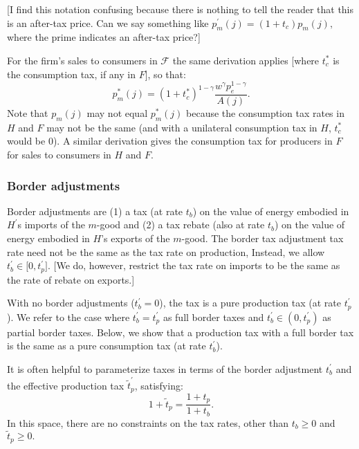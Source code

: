 \documentclass[notitlepage,12pt]{article}
\begin{document}
[I find this notation confusing because there is nothing to tell the reader
that this is an after-tax price. Can we say something like $p_{m}^{\prime
}\left( j\right) =\left( 1+t_{c}\right) p_{m}\left( j\right) ,$ where the
prime indicates an after-tax price?]

For the firm's sales to consumers in $\mathcal{F}$ the same derivation
applies [where $t_{c}^{\ast }$ is the consumption tax, if any in $F$], so
that:%
\begin{equation*}
p_{m}^{\ast }(j)=\left( 1+t_{c}^{\ast }\right) ^{1-\gamma }\frac{w^{\gamma
}p_{e}^{1-\gamma }}{A(j)}.
\end{equation*}%
Note that $p_{m}\left( j\right) $ may not equal $p_{m}^{\ast }\left(
j\right) $ because the consumption tax rates in $H$ and $F$ may not be the
same (and with a unilateral consumption tax in $H$, $t_{c}^{\ast }$ would be 
$0$). A similar derivation gives the consumption tax for producers in $F$
for sales to consumers in $H$ and $F$.

\subsubsection{Border adjustments}

Border adjustments are (1) a tax (at rate $t_{b}$) on the value of energy
embodied in $H^{\prime }$s imports of the $m$-good and (2) a tax rebate
(also at rate $t_{b}$) on the value of energy embodied in $H$'s exports of
the $m$-good. The border tax adjustment tax rate need not be the same as the
tax rate on production, Instead, we allow $t_{b}^{\prime }\in \lbrack
0,t_{p}^{\prime }]$. [We do, however, restrict the tax rate on imports to be
the same as the rate of rebate on exports.]

With no border adjustments ($t_{b}^{\prime }=0$), the tax is a pure
production tax (at rate $t_{p}^{\prime }$). We refer to the case where $%
t_{b}^{\prime }=t_{p}^{\prime }$ as full border taxes and $t_{b}^{\prime
}\in \left( 0,t_{p}^{\prime }\right) $ as partial border taxes. Below, we
show that a production tax with a full border tax is the same as a pure
consumption tax (at rate $t_{b}^{\prime }$).

It is often helpful to parameterize taxes in terms of the border adjustment $%
t_{b}^{\prime }$ and the effective production tax $\tilde{t}_{p}^{\prime }$,
satisfying:%
\begin{equation*}
1+\tilde{t}_{p}=\frac{1+t_{p}}{1+t_{b}}.
\end{equation*}%
In this space, there are no constraints on the tax rates, other than $%
t_{b}\geq 0$ and $\tilde{t}_{p}\geq 0.$
\end{document}
